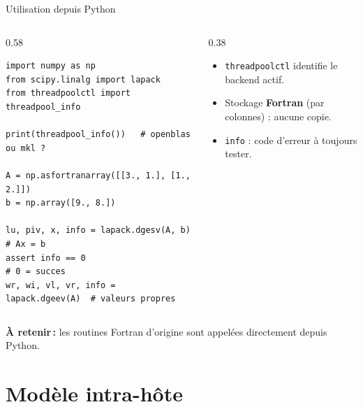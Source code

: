 \documentclass[aspectratio=169,11pt,t]{beamer}
\newcommand{\takeaway}[1]{\vfill\noindent{\color{gold}\vrule width 3pt}\colorbox{lightbg}{\parbox[c]{\dimexpr\textwidth-3pt-2\fboxsep\relax}{\vphantom{Ég}\small\textbf{\color{navy}À retenir\,:} #1\vphantom{Ég}}}\par}
\begin{document}
\begin{frame}[fragile]{Utilisation depuis Python}
    \begin{columns}[T,onlytextwidth]
        \begin{column}{0.58\textwidth}
            \begin{lstlisting}
import numpy as np
from scipy.linalg import lapack
from threadpoolctl import threadpool_info

print(threadpool_info())   # openblas ou mkl ?

A = np.asfortranarray([[3., 1.], [1., 2.]])
b = np.array([9., 8.])

lu, piv, x, info = lapack.dgesv(A, b)   # Ax = b
assert info == 0                        # 0 = succes
wr, wi, vl, vr, info = lapack.dgeev(A)  # valeurs propres
            \end{lstlisting}
        \end{column}
        \begin{column}{0.38\textwidth}
            \begin{itemize}
                \item \texttt{threadpoolctl} identifie le backend actif.
                \item Stockage \textbf{Fortran} (par colonnes) : aucune copie.
                \item \texttt{info} : code d'erreur à toujours tester.
            \end{itemize}
        \end{column}
    \end{columns}
    \takeaway{les routines Fortran d'origine sont appelées directement depuis Python.}
\end{frame}

\section{Modèle intra-hôte}
\end{document}
